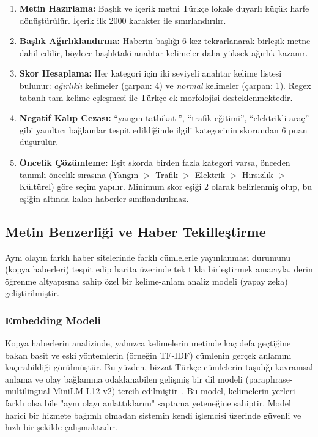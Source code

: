 \documentclass[conference]{IEEEtran}
\begin{document}
    \begin{enumerate}[noitemsep]
    \item \textbf{Metin Haz{\i}rlama:} Ba{\c s}l{\i}k ve i{\c c}erik metni T{\"u}rk{\c c}e lokale duyarl{\i} k{\"u}{\c c}{\"u}k harfe d{\"o}n{\"u}{\c s}t{\"u}r{\"u}l{\"u}r. {\.I}{\c c}erik ilk 2000 karakter ile s{\i}n{\i}rland{\i}r{\i}l{\i}r.
    \item \textbf{Ba{\c s}l{\i}k A{\u g}{\i}rl{\i}kland{\i}rma:} Haberin ba{\c s}l{\i}{\u g}{\i} 6 kez tekrarlanarak birle{\c s}ik metne dahil edilir, b{\"o}ylece ba{\c s}l{\i}ktaki anahtar kelimeler daha y{\"u}ksek a{\u g}{\i}rl{\i}k kazan{\i}r.
    \item \textbf{Skor Hesaplama:} Her kategori i{\c c}in iki seviyeli anahtar kelime listesi bulunur: \textit{a{\u g}{\i}rl{\i}kl{\i}} kelimeler ({\c c}arpan: 4) ve \textit{normal} kelimeler ({\c c}arpan: 1). Regex tabanl{\i} tam kelime e{\c s}le{\c s}mesi ile T{\"u}rk{\c c}e ek morfolojisi desteklenmektedir.
    \item \textbf{Negatif Kal{\i}p Cezas{\i}:} ``yang{\i}n tatbikat{\i}'', ``trafik e{\u g}itimi'', ``elektrikli ara{\c c}'' gibi yan{\i}lt{\i}c{\i} ba{\u g}lamlar tespit edildi{\u g}inde ilgili kategorinin skorundan 6 puan d{\"u}{\c s}{\"u}r{\"u}l{\"u}r.
    \item \textbf{{\"O}ncelik {\c C}{\"o}z{\"u}mleme:} E{\c s}it skorda birden fazla kategori varsa, {\"o}nceden tan{\i}ml{\i} {\"o}ncelik s{\i}ras{\i}na (Yang{\i}n $>$ Trafik $>$ Elektrik $>$ H{\i}rs{\i}zl{\i}k $>$ K{\"u}lt{\"u}rel) g{\"o}re se{\c c}im yap{\i}l{\i}r. Minimum skor e{\c s}i{\u g}i 2 olarak belirlenmi{\c s} olup, bu e{\c s}i{\u g}in alt{\i}nda kalan haberler s{\i}n{\i}fland{\i}r{\i}lmaz.
    \end{enumerate}

    \subsection{Metin Benzerli{\u g}i ve Haber Tekille{\c s}tirme}
    Aynı olayın farklı haber sitelerinde farklı cümlelerle yayınlanması durumunu (kopya haberleri) tespit edip harita üzerinde tek tıkla birleştirmek amacıyla, derin öğrenme altyapısına sahip özel bir kelime-anlam analiz modeli (yapay zeka) geliştirilmiştir.

    \subsubsection{Embedding Modeli}
    Kopya haberlerin analizinde, yalnızca kelimelerin metinde kaç defa geçtiğine bakan basit ve eski yöntemlerin (örneğin TF-IDF) cümlenin gerçek anlamını kaçırabildiği görülmüştür. Bu yüzden, bizzat Türkçe cümlelerin taşıdığı kavramsal anlama ve olay bağlamına odaklanabilen gelişmiş bir dil modeli (paraphrase-multilingual-MiniLM-L12-v2) tercih edilmiştir~\cite{reimers2019sentence}. Bu model, kelimelerin yerleri farklı olsa bile "aynı olayı anlattıklarını" saptama yeteneğine sahiptir. Model harici bir hizmete bağımlı olmadan sistemin kendi işlemcisi üzerinde güvenli ve hızlı bir şekilde çalışmaktadır.
\end{document}
